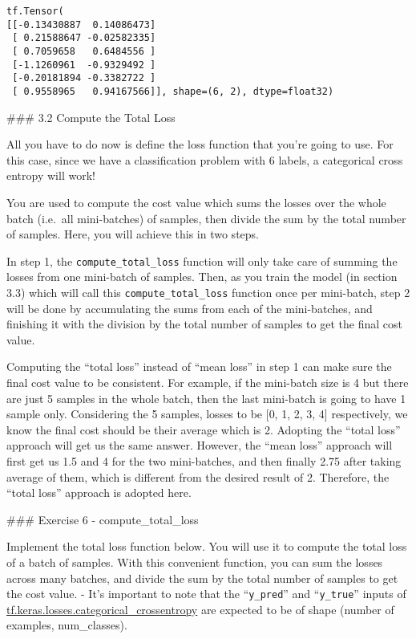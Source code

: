 \documentclass[11pt]{article}
\begin{document}
\begin{verbatim}
tf.Tensor(
[[-0.13430887  0.14086473]
 [ 0.21588647 -0.02582335]
 [ 0.7059658   0.6484556 ]
 [-1.1260961  -0.9329492 ]
 [-0.20181894 -0.3382722 ]
 [ 0.9558965   0.94167566]], shape=(6, 2), dtype=float32)
\end{verbatim}

    \#\#\# 3.2 Compute the Total Loss

All you have to do now is define the loss function that you're going to
use. For this case, since we have a classification problem with 6
labels, a categorical cross entropy will work!

You are used to compute the cost value which sums the losses over the
whole batch (i.e.~all mini-batches) of samples, then divide the sum by
the total number of samples. Here, you will achieve this in two steps.

In step 1, the \texttt{compute\_total\_loss} function will only take
care of summing the losses from one mini-batch of samples. Then, as you
train the model (in section 3.3) which will call this
\texttt{compute\_total\_loss} function once per mini-batch, step 2 will
be done by accumulating the sums from each of the mini-batches, and
finishing it with the division by the total number of samples to get the
final cost value.

Computing the ``total loss'' instead of ``mean loss'' in step 1 can make
sure the final cost value to be consistent. For example, if the
mini-batch size is 4 but there are just 5 samples in the whole batch,
then the last mini-batch is going to have 1 sample only. Considering the
5 samples, losses to be {[}0, 1, 2, 3, 4{]} respectively, we know the
final cost should be their average which is 2. Adopting the ``total
loss'' approach will get us the same answer. However, the ``mean loss''
approach will first get us 1.5 and 4 for the two mini-batches, and then
finally 2.75 after taking average of them, which is different from the
desired result of 2. Therefore, the ``total loss'' approach is adopted
here.

\#\#\# Exercise 6 - compute\_total\_loss

Implement the total loss function below. You will use it to compute the
total loss of a batch of samples. With this convenient function, you can
sum the losses across many batches, and divide the sum by the total
number of samples to get the cost value. - It's important to note that
the ``\texttt{y\_pred}'' and ``\texttt{y\_true}'' inputs of
\href{https://www.tensorflow.org/api_docs/python/tf/keras/losses/categorical_crossentropy}{tf.keras.losses.categorical\_crossentropy}
are expected to be of shape (number of examples, num\_classes).
\end{document}
